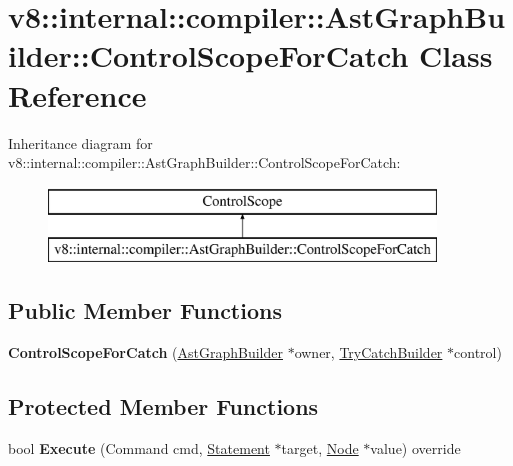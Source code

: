 \hypertarget{classv8_1_1internal_1_1compiler_1_1_ast_graph_builder_1_1_control_scope_for_catch}{}\section{v8\+:\+:internal\+:\+:compiler\+:\+:Ast\+Graph\+Builder\+:\+:Control\+Scope\+For\+Catch Class Reference}
\label{classv8_1_1internal_1_1compiler_1_1_ast_graph_builder_1_1_control_scope_for_catch}
Inheritance diagram for v8\+:\+:internal\+:\+:compiler\+:\+:Ast\+Graph\+Builder\+:\+:Control\+Scope\+For\+Catch\+:\begin{figure}[H]
\begin{center}
\leavevmode
\includegraphics[height=2.000000cm]{classv8_1_1internal_1_1compiler_1_1_ast_graph_builder_1_1_control_scope_for_catch}
\end{center}
\end{figure}
\subsection*{Public Member Functions}
\begin{DoxyCompactItemize}
\item 
{\bfseries Control\+Scope\+For\+Catch} (\hyperlink{classv8_1_1internal_1_1compiler_1_1_ast_graph_builder}{Ast\+Graph\+Builder} $\ast$owner, \hyperlink{classv8_1_1internal_1_1compiler_1_1_try_catch_builder}{Try\+Catch\+Builder} $\ast$control)\hypertarget{classv8_1_1internal_1_1compiler_1_1_ast_graph_builder_1_1_control_scope_for_catch_ab62edc30ecb9430f5dfd460457c0e4c0}{}\label{classv8_1_1internal_1_1compiler_1_1_ast_graph_builder_1_1_control_scope_for_catch_ab62edc30ecb9430f5dfd460457c0e4c0}

\end{DoxyCompactItemize}
\subsection*{Protected Member Functions}
\begin{DoxyCompactItemize}
\item 
bool {\bfseries Execute} (Command cmd, \hyperlink{classv8_1_1internal_1_1_statement}{Statement} $\ast$target, \hyperlink{classv8_1_1internal_1_1compiler_1_1_node}{Node} $\ast$value) override\hypertarget{classv8_1_1internal_1_1compiler_1_1_ast_graph_builder_1_1_control_scope_for_catch_a188bcaf588011c656e210fc3c4eefce4}{}\label{classv8_1_1internal_1_1compiler_1_1_ast_graph_builder_1_1_control_scope_for_catch_a188bcaf588011c656e210fc3c4eefce4}

\end{DoxyCompactItemize}

